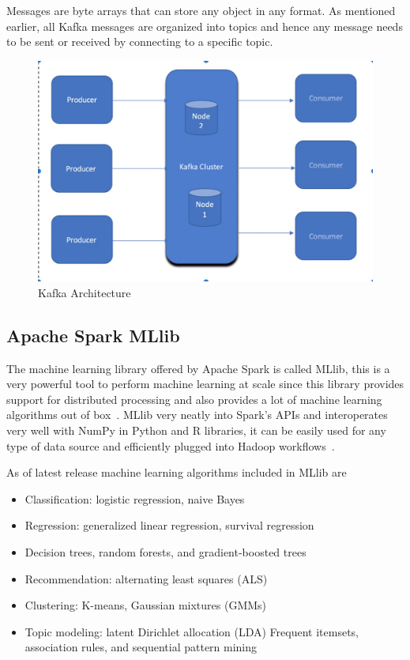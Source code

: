 Messages are byte arrays that can store any object in any format. As
mentioned earlier, all Kafka messages are organized into topics and
hence any message needs to be sent or received by connecting to a
specific topic.

\begin{figure}[htbp] 
	\centering
	\includegraphics[width=\columnwidth]{images/kafkaarchitecture.jpg}
	\caption{Kafka Architecture}
\label{fig:kafkaarchitecture} 
\end{figure}

\subsection{Apache Spark MLlib}

The machine learning library offered by Apache Spark is called MLlib,
this is a very powerful tool to perform machine learning at scale
since this library provides support for distributed processing and
also provides a lot of machine learning algorithms out of
box~\cite{hid-sp18-510-sparkml}. MLlib very neatly into Spark's APIs
and interoperates very well with NumPy in Python and R libraries, it
can be easily used for any type of data source and efficiently plugged
into Hadoop workflows~\cite{hid-sp18-510-apmllib}.

As of latest release machine learning algorithms included in MLlib are 
\begin{itemize}
\item Classification: logistic regression, naive Bayes
\item Regression: generalized linear regression, survival regression
\item Decision trees, random forests, and gradient-boosted trees
\item Recommendation: alternating least squares (ALS)
\item Clustering: K-means, Gaussian mixtures (GMMs)
\item Topic modeling: latent Dirichlet allocation (LDA)
Frequent itemsets, association rules, and sequential pattern mining
\end{itemize}

